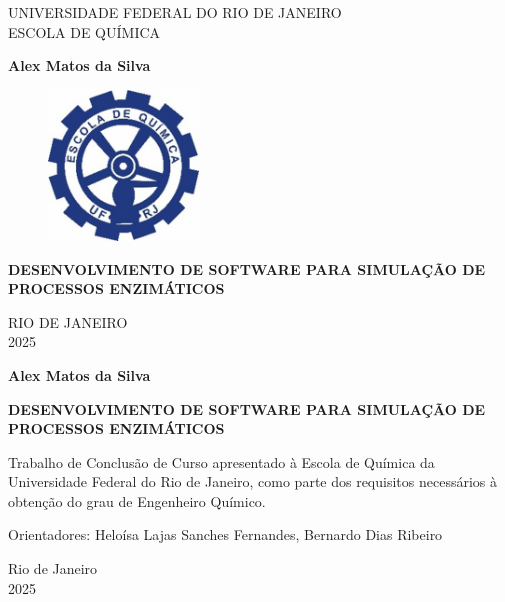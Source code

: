 \documentclass[12pt,oneside]{report}
\begin{document}
\onehalfspacing

\begin{titlepage}
    \begin{center}
        \large
        UNIVERSIDADE FEDERAL DO RIO DE JANEIRO \\
        ESCOLA DE QUÍMICA

        \vspace{2cm}

        \textbf{Alex Matos da Silva}

        \vspace{2cm}

        \begin{figure}[htp]
            \centering
            \includegraphics[width=4cm]{Logo-EQ.jpg}
        \end{figure}

        \vspace{2cm}

        \textbf{\Large DESENVOLVIMENTO DE SOFTWARE PARA SIMULAÇÃO DE PROCESSOS ENZIMÁTICOS}

        \vfill

        RIO DE JANEIRO \\
        2025
    \end{center}
\end{titlepage}

\begin{titlepage}
    \begin{center}
        \textbf{Alex Matos da Silva}

        \vfill

        \textbf{\Large DESENVOLVIMENTO DE SOFTWARE PARA SIMULAÇÃO DE PROCESSOS ENZIMÁTICOS}

        \vfill

        Trabalho de Conclusão de Curso apresentado à Escola de Química da Universidade Federal do Rio de Janeiro, como parte dos requisitos necessários à obtenção do grau de Engenheiro Químico.

        \vfill

        Orientadores: Heloísa Lajas Sanches Fernandes, Bernardo Dias Ribeiro

        \vfill

        Rio de Janeiro \\
        2025
    \end{center}
\end{titlepage}
\end{document}
